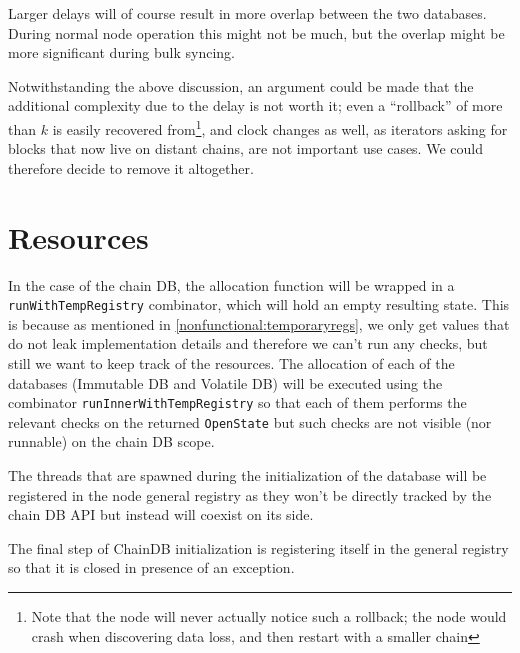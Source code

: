 Larger delays will of course result in more overlap between the two databases.
During normal node operation this might not be much, but the overlap might be
more significant during bulk syncing.

Notwithstanding the above discussion, an argument could be made that the
additional complexity due to the delay is not worth it; even a ``rollback'' of
more than $k$ is easily recovered from\footnote{Note that the node will never
actually notice such a rollback; the node would crash when discovering data
loss, and then restart with a smaller chain}, and clock changes as well, as
iterators asking for blocks that now live on distant chains, are not important
use cases. We could therefore decide to remove it altogether.

\section{Resources}
\label{chaindb:resources}

In the case of the chain DB, the allocation function will be wrapped in a
\lstinline!runWithTempRegistry! combinator, which will hold an empty resulting
state. This is because as mentioned in \ref{nonfunctional:temporaryregs}, we only get
values that do not leak implementation details and therefore we can't run any
checks, but still we want to keep track of the resources. The allocation of each
of the databases (Immutable DB and Volatile DB) will be executed using the
combinator \lstinline!runInnerWithTempRegistry! so that each of them performs
the relevant checks on the returned \lstinline!OpenState! but such checks are
not visible (nor runnable) on the chain DB scope.

The threads that are spawned during the initialization of the database will be
registered in the node general registry as they won't be directly tracked by the
chain DB API but instead will coexist on its side.

The final step of ChainDB initialization is registering itself in the general
registry so that it is closed in presence of an exception.

